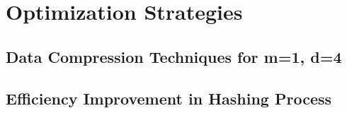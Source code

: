 \section{Optimization Strategies}

\subsection{Data Compression Techniques for m=1, d=4}

\subsection{Efficiency Improvement in Hashing Process}